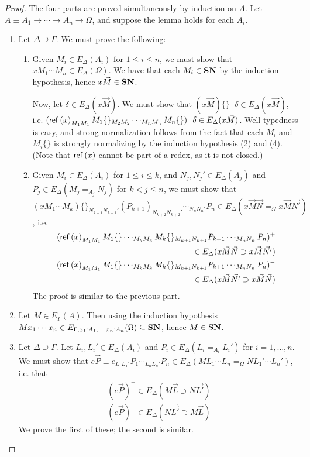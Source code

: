 \begin{proof}
The four parts are proved simultaneously by induction on $A$.  Let $A \equiv A_1 \rightarrow \cdots \rightarrow A_n \rightarrow \Omega$,
and suppose the lemma holds for each $A_i$.
\begin{enumerate}
\item
Let $\Delta \supseteq \Gamma$.  We must prove the following:
\begin{enumerate}
\item
Given $M_i \in E_\Delta(A_i)$ for $1 \leq i \leq n$, we must show that $x M_1 \cdots M_n \in E_\Delta(\Omega)$.  We have that
each $M_i \in \mathbf{SN}$ by the induction hypothesis, hence $x \vec{M} \in \mathbf{SN}$.

Now, let $\delta \in E_\Delta(x \vec{M})$.  We must show that $(x \vec{M}) \{\} ^+ \delta \in E_\Delta(x \vec{M})$,
i.e. $(\mathsf{ref} \left( {x} \right)_{M_1 M_1} M_1 \{\}_{M_2 M_2} \cdots_{M_n M_n} M_n\{\})^+ \delta \in E_\Delta(x \vec{M})$.
Well-typedness is easy, and strong normalization follows from the fact that each $M_i$ and $M_i \{\}$ is strongly
normalizing by the induction hypothesis (2) and (4).  (Note that $\mathsf{ref} \left( {x} \right)$ cannot be part of a redex, as it is not closed.)
\item
Given $M_i \in E_\Delta(A_i)$ for $1 \leq i \leq k$, and $N_j, N_j' \in E_\Delta(A_j)$ and $P_j \in E_\Delta(M_j =_{A_j} N_j)$ for
$k < j \leq n$, we must show that \\
$(x M_1 \cdots M_k)\{\}_{N_{k+1}N_{k+1}'} (P_{k+1})_{N_{k+2}N_{k+2}'} \cdots_{N_n N_n'} P_n \in E_\Delta(x \vec{M} \vec{N} =_\Omega x \vec{M} \vec{N'})$,
i.e.
\begin{align*}
(\mathsf{ref} \left( {x} \right)_{M_1 M_1} M_1\{\} \cdots_{M_k M_k} M_k\{\}_{M_{k+1} N_{k+1}} P_{k+1} \cdots_{M_n N_n} P_n)^+ \\
\in E_\Delta(x \vec{M} \vec{N} \supset x \vec{M} \vec{N'}) \\
(\mathsf{ref} \left( {x} \right)_{M_1 M_1} M_1\{\} \cdots_{M_k M_k} M_k\{\}_{M_{k+1} N_{k+1}} P_{k+1} \cdots_{M_n N_n} P_n)^- \\
\in E_\Delta(x \vec{M} \vec{N'} \supset x \vec{M} \vec{N})
\end{align*}
The proof is similar to the previous part.
\end{enumerate}
\item
Let $M \in E_\Gamma(A)$.  Then using the induction hypothesis $M x_1 \cdots x_n \in E_{\Gamma, x_1 : A_1, \ldots, x_n : A_n}(\Omega) \subseteq \mathbf{SN}$,
hence $M \in \mathbf{SN}$.
\item
Let $\Delta \supseteq \Gamma$.  Let $L_i, L_i' \in E_\Delta(A_i)$ and
$P_i \in E_\Delta(L_i =_{A_i} L_i')$ for $i = 1, \ldots, n$.  We must show that
$e \vec{P} \equiv e_{L_1 L_1'} P_1 \cdots_{L_n L_n'} P_n \in E_\Delta(M L_1 \cdots L_n =_{\Omega} N L_1' \cdots L_n')$, i.e. that
\begin{align*}
(e \vec{P})^+ \in E_\Delta(M \vec{L} \supset N \vec{L'}) \\
(e \vec{P})^- \in E_\Delta(N \vec{L'} \supset M \vec{L})
\end{align*}
We prove the first of these; the second is similar.


\end{enumerate}
\end{proof}
